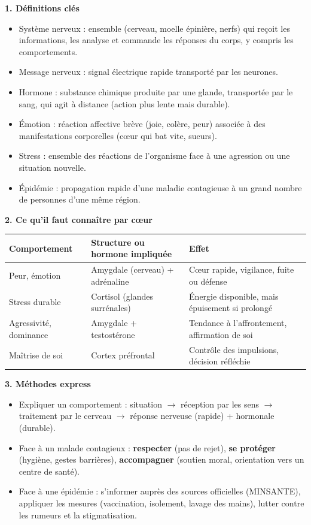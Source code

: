 \documentclass[11pt]{article}
\newcommand{\cle}[1]{{\popxbold\color{popdark}#1}}
\begin{document}
\begin{bilan}
\textbf{1. Définitions clés}
\begin{itemize}
  \item \cle{Système nerveux} : ensemble (cerveau, moelle épinière, nerfs) qui reçoit les informations, les analyse et commande les réponses du corps, y compris les comportements.
  \item \cle{Message nerveux} : signal électrique rapide transporté par les neurones.
  \item \cle{Hormone} : substance chimique produite par une glande, transportée par le sang, qui agit à distance (action plus lente mais durable).
  \item \cle{Émotion} : réaction affective brève (joie, colère, peur) associée à des manifestations corporelles (cœur qui bat vite, sueurs).
  \item \cle{Stress} : ensemble des réactions de l'organisme face à une agression ou une situation nouvelle.
  \item \cle{Épidémie} : propagation rapide d'une maladie contagieuse à un grand nombre de personnes d'une même région.
\end{itemize}

\textbf{2. Ce qu'il faut connaître par cœur}
\begin{center}
\begin{tabularx}{\linewidth}{|l|X|X|}
\hline
\rowcolor{popblueL} \textbf{Comportement} & \textbf{Structure ou hormone impliquée} & \textbf{Effet} \\
\hline
Peur, émotion & Amygdale (cerveau) + adrénaline & Cœur rapide, vigilance, fuite ou défense \\
\hline
Stress durable & Cortisol (glandes surrénales) & Énergie disponible, mais épuisement si prolongé \\
\hline
Agressivité, dominance & Amygdale + testostérone & Tendance à l'affrontement, affirmation de soi \\
\hline
Maîtrise de soi & Cortex préfrontal & Contrôle des impulsions, décision réfléchie \\
\hline
\end{tabularx}
\end{center}

\textbf{3. Méthodes express}
\begin{itemize}
  \item Expliquer un comportement : situation $\rightarrow$ réception par les sens $\rightarrow$ traitement par le cerveau $\rightarrow$ réponse nerveuse (rapide) + hormonale (durable).
  \item Face à un malade contagieux : \textbf{respecter} (pas de rejet), \textbf{se protéger} (hygiène, gestes barrières), \textbf{accompagner} (soutien moral, orientation vers un centre de santé).
  \item Face à une épidémie : s'informer auprès des sources officielles (MINSANTE), appliquer les mesures (vaccination, isolement, lavage des mains), lutter contre les rumeurs et la stigmatisation.
\end{itemize}
\end{bilan}
\end{document}
